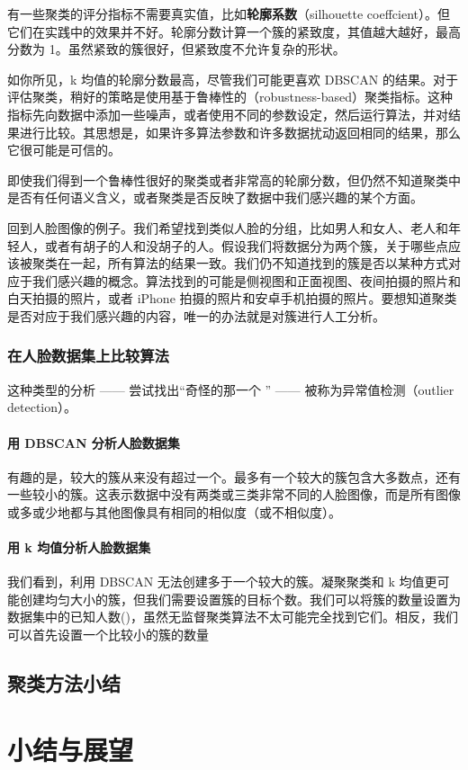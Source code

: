 有一些聚类的评分指标不需要真实值，比如\textbf{轮廓系数}（silhouette coeffcient）。但它们在实践中的效果并不好。轮廓分数计算一个簇的紧致度，其值越大越好，最高分数为 1。虽然紧致的簇很好，但紧致度不允许复杂的形状。

如你所见，k 均值的轮廓分数最高，尽管我们可能更喜欢 DBSCAN 的结果。对于评估聚类，稍好的策略是使用基于鲁棒性的（robustness-based）聚类指标。这种指标先向数据中添加一些噪声，或者使用不同的参数设定，然后运行算法，并对结果进行比较。其思想是，如果许多算法参数和许多数据扰动返回相同的结果，那么它很可能是可信的。

即使我们得到一个鲁棒性很好的聚类或者非常高的轮廓分数，但仍然不知道聚类中是否有任何语义含义，或者聚类是否反映了数据中我们感兴趣的某个方面。

回到人脸图像的例子。我们希望找到类似人脸的分组，比如男人和女人、老人和年轻人，或者有胡子的人和没胡子的人。假设我们将数据分为两个簇，关于哪些点应该被聚类在一起，所有算法的结果一致。我们仍不知道找到的簇是否以某种方式对应于我们感兴趣的概念。算法找到的可能是侧视图和正面视图、夜间拍摄的照片和白天拍摄的照片，或者 iPhone 拍摄的照片和安卓手机拍摄的照片。要想知道聚类是否对应于我们感兴趣的内容，唯一的办法就是对簇进行人工分析。

\subsubsection{在人脸数据集上比较算法}
这种类型的分析 —— 尝试找出“奇怪的那一个 ” —— 被称为异常值检测（outlier detection）。

\paragraph{用 DBSCAN 分析人脸数据集} 有趣的是，较大的簇从来没有超过一个。最多有一个较大的簇包含大多数点，还有一些较小的簇。这表示数据中没有两类或三类非常不同的人脸图像，而是所有图像或多或少地都与其他图像具有相同的相似度（或不相似度）。

\paragraph{用 k 均值分析人脸数据集} 我们看到，利用 DBSCAN 无法创建多于一个较大的簇。凝聚聚类和 k 均值更可能创建均匀大小的簇，但我们需要设置簇的目标个数。我们可以将簇的数量设置为数据集中的已知人数()，虽然无监督聚类算法不太可能完全找到它们。相反，我们可以首先设置一个比较小的簇的数量
\subsection{聚类方法小结}
\section{小结与展望}